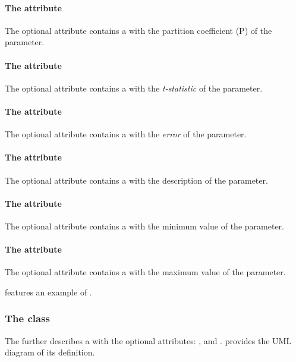 \paragraph{The  attribute}
The optional attribute  contains a  with the partition
coefficient (P) of the parameter.

\paragraph{The  attribute}
The optional attribute  contains a  with the
\emph{t-statistic} of the parameter.

\paragraph{The  attribute}
The optional attribute  contains a  with the
\emph{error} of the parameter.

\paragraph{The  attribute}
The optional attribute  contains a  with the
description of the parameter.

\paragraph{The  attribute}
The optional attribute  contains a  with the
minimum value of the parameter.

\paragraph{The  attribute}
The optional attribute  contains a  with the
maximum value of the parameter.

 features an example of \ParameterMetaData.


\subsubsection{The  class}
\label{rulemetadata-class}
The \RuleMetaData further describes a \Rule with the optional attributes:
,  and . 
provides the UML diagram of its definition.

